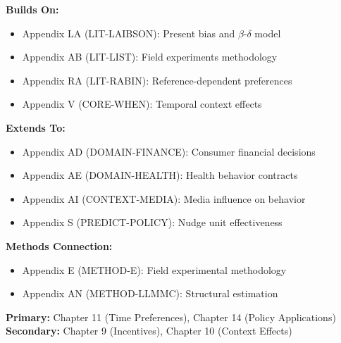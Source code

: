 \begin{tcolorbox}[colback=blue!5!white,colframe=blue!75!black,title=Cross-Reference Map]
\textbf{Builds On:}
\begin{itemize}
    \item Appendix LA (LIT-LAIBSON): Present bias and $\beta$-$\delta$ model
    \item Appendix AB (LIT-LIST): Field experiments methodology
    \item Appendix RA (LIT-RABIN): Reference-dependent preferences
    \item Appendix V (CORE-WHEN): Temporal context effects
\end{itemize}

\textbf{Extends To:}
\begin{itemize}
    \item Appendix AD (DOMAIN-FINANCE): Consumer financial decisions
    \item Appendix AE (DOMAIN-HEALTH): Health behavior contracts
    \item Appendix AI (CONTEXT-MEDIA): Media influence on behavior
    \item Appendix S (PREDICT-POLICY): Nudge unit effectiveness
\end{itemize}

\textbf{Methods Connection:}
\begin{itemize}
    \item Appendix E (METHOD-E): Field experimental methodology
    \item Appendix AN (METHOD-LLMMC): Structural estimation
\end{itemize}
\end{tcolorbox}

\begin{tcolorbox}[colback=green!5!white,colframe=green!75!black,title=Chapter Linkage]
\textbf{Primary:} Chapter 11 (Time Preferences), Chapter 14 (Policy Applications) \\
\textbf{Secondary:} Chapter 9 (Incentives), Chapter 10 (Context Effects)
\end{tcolorbox}


